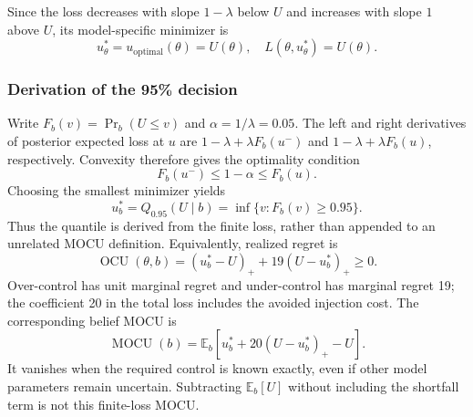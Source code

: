 Since the loss decreases with slope $1-\lambda$ below $U$ and increases with
slope $1$ above $U$, its model-specific minimizer is
\begin{equation}
u_\theta^*=u_{\mathrm{optimal}}(\theta)=U(\theta),
\quad L(\theta,u_\theta^*)=U(\theta).
\label{eq:model_specific_control}
\end{equation}

\subsubsection{Derivation of the 95\% decision}
Write $F_b(v)=\Pr_b(U\le v)$ and $\alpha=1/\lambda=0.05$.
The left and right derivatives of posterior expected loss at $u$ are
$1-\lambda+\lambda F_b(u^-)$ and
$1-\lambda+\lambda F_b(u)$, respectively. Convexity therefore gives the
optimality condition
\begin{equation}
F_b(u^- )\le 1-\alpha\le F_b(u).
\label{eq:quantile_optimality}
\end{equation}
Choosing the smallest minimizer yields
\begin{equation}
u_b^*=Q_{0.95}(U\mid b)
=\inf\{v:F_b(v)\ge0.95\}.
\label{eq:u_ctrl_support}
\end{equation}
Thus the quantile is derived from the finite loss, rather than appended to
an unrelated MOCU definition. Equivalently, realized regret is
\begin{equation}
\operatorname{OCU}(\theta,b)
=(u_b^*-U)_++19(U-u_b^*)_+\ge0.
\label{eq:ocu}
\end{equation}
Over-control has unit marginal regret and under-control has marginal regret
19; the coefficient 20 in the total loss includes the avoided injection cost.
The corresponding belief MOCU is
\begin{equation}
\operatorname{MOCU}(b)=\mathbb E_b\!\left[
u_b^*+20(U-u_b^*)_+-U\right].
\label{eq:belief_mocu}
\end{equation}
It vanishes when the required control is known exactly, even if other model
parameters remain uncertain. Subtracting $\mathbb E_b[U]$ without including
the shortfall term is not this finite-loss MOCU.

